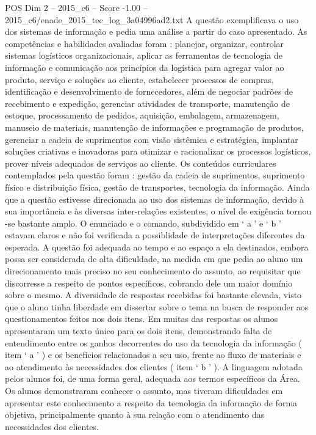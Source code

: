 \begin{textsample}{POS Dim 2 – 2015\_c6 – Score -1.00 – 2015\_c6/enade\_2015\_tec\_log\_3a04996ad2.txt}
A questão exemplificava o uso dos sistemas de informação e pedia uma análise a partir do caso apresentado.
As competências e habilidades avaliadas foram : planejar, organizar, controlar sistemas logísticos organizacionais, aplicar as ferramentas de tecnologia de informação e comunicação aos princípios da logística para agregar valor ao produto, serviço e soluções ao cliente, estabelecer processos de compras, identificação e desenvolvimento de fornecedores, além de negociar padrões de recebimento e expedição, gerenciar atividades de transporte, manutenção de estoque, processamento de pedidos, aquisição, embalagem, armazenagem, manuseio de materiais, manutenção de informações e programação de produtos, gerenciar a cadeia de suprimentos com visão sistêmica e estratégica, implantar soluções criativas e inovadoras para otimizar e racionalizar os processos logísticos, prover níveis adequados de serviços ao cliente.
Os conteúdos curriculares contemplados pela questão foram : gestão da cadeia de suprimentos, suprimento físico e distribuição física, gestão de transportes, tecnologia da informação.
Ainda que a questão estivesse direcionada ao uso dos sistemas de informação, devido à sua importância e às diversas inter-relações existentes, o nível de exigência tornou -se bastante amplo.
O enunciado e o comando, subdividido em ‘ a ’ e ‘ b ’ estavam claros e não foi verificada a possiblidade de interpretações diferentes da esperada.
A questão foi adequada ao tempo e ao espaço a ela destinados, embora possa ser considerada de alta dificuldade, na medida em que pedia ao aluno um direcionamento mais preciso no seu conhecimento do assunto, ao requisitar que discorresse a respeito de pontos específicos, cobrando dele um maior domínio sobre o mesmo.
A diversidade de respostas recebidas foi bastante elevada, visto que o aluno tinha liberdade em dissertar sobre o tema na busca de responder aos questionamentos feitos nos dois itens.
Em muitas das respostas os alunos apresentaram um texto único para os dois itens, demonstrando falta de entendimento entre os ganhos decorrentes do uso da tecnologia da informação ( item ‘ a ’ ) e os benefícios relacionados a seu uso, frente ao fluxo de materiais e ao atendimento às necessidades dos clientes ( item ‘ b ’ ).
A linguagem adotada pelos alunos foi, de uma forma geral, adequada aos termos específicos da Área.
Os alunos demonstraram conhecer o assunto, mas tiveram dificuldades em apresentar este conhecimento a respeito da tecnologia da informação de forma objetiva, principalmente quanto à sua relação com o atendimento das necessidades dos clientes.

\end{textsample}

